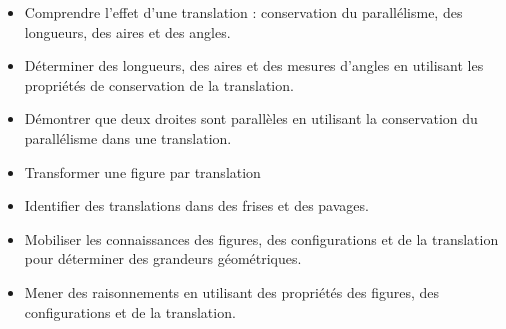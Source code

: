 \begin{prerequis}[Objectifs de 4\up{e}]
    \begin{itemize}                
        \item Comprendre l'effet d'une translation : conservation du parallélisme, des longueurs, des aires et des angles.
        \item Déterminer des longueurs, des aires et des mesures d'angles en utilisant les propriétés de conservation de la translation.
        \item Démontrer que deux droites sont parallèles en utilisant la conservation du parallélisme dans une translation.
        \item Transformer une figure par translation
        \item Identifier des translations dans des frises et des pavages.
        \item Mobiliser les connaissances des figures, des configurations et de la translation pour déterminer des grandeurs géométriques.
        \item Mener des raisonnements en utilisant des propriétés des figures, des configurations et de la translation.
    \end{itemize}
\end{prerequis}
